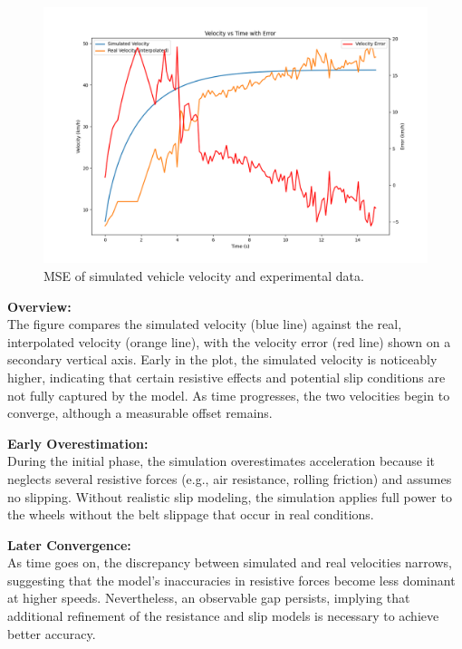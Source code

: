 \documentclass[12pt, titlepage]{article}
\begin{document}
\begin{figure}[H]
  \begin{center}
   \includegraphics[width=\textwidth]{MSE Graphs/speed.png}
  \caption{MSE of simulated vehicle velocity and experimental data.}
  \label{Fig_Velocity} 
  \end{center}
\end{figure}

\textbf{Overview:}\\
The figure compares the simulated velocity (blue line) against the real, interpolated velocity (orange line), with the velocity error (red line) shown on a secondary vertical axis. Early in the plot, the simulated velocity is noticeably higher, indicating that certain resistive effects and potential slip conditions are not fully captured by the model. As time progresses, the two velocities begin to converge, although a measurable offset remains.

\textbf{Early Overestimation:}\\
During the initial phase, the simulation overestimates acceleration because it neglects several resistive forces (e.g., air resistance, rolling friction) and assumes no slipping. Without realistic slip modeling, the simulation applies full power to the wheels without the belt slippage that occur in real conditions.

\textbf{Later Convergence:}\\
As time goes on, the discrepancy between simulated and real velocities narrows, suggesting that the model's inaccuracies in resistive forces become less dominant at higher speeds. Nevertheless, an observable gap persists, implying that additional refinement of the resistance and slip models is necessary to achieve better accuracy.
\end{document}
